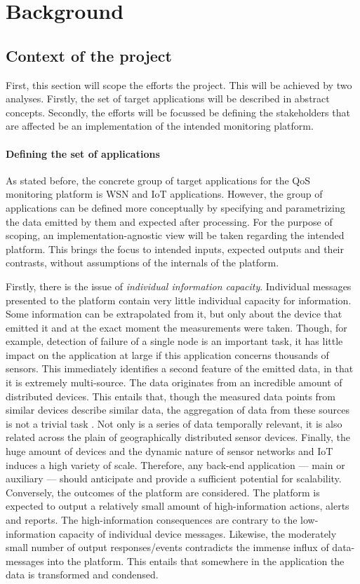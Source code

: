 \chapter{Background}
\label{ch:back}
\section{Context of the project}
\label{sec:back:context}
First, this section will scope the efforts the project. This will be achieved by two analyses. Firstly, the set of target applications will be described in abstract concepts. Secondly, the efforts will be focussed  be defining the stakeholders that are affected be an implementation of the intended monitoring platform.

\subsubsection*{Defining the set of applications}
As stated before, the concrete group of target applications for the QoS monitoring platform is WSN and IoT applications. However, the group of applications can be defined more conceptually by specifying and parametrizing the data emitted by them and expected after processing. For the purpose of scoping, an implementation-agnostic view will be taken regarding the intended platform. This brings the focus to intended inputs, expected outputs and their contrasts, without assumptions of the internals of the platform.

Firstly, there is the issue of \emph{individual information capacity}. Individual messages presented to the platform contain very little individual capacity for information. Some information can be extrapolated from it, but only about the device that emitted it and at the exact moment the measurements were taken. Though, for example, detection of failure of a single node is an important task, it has little impact on the application at large if this application concerns thousands of sensors. This immediately identifies a second feature of the emitted data, in that it is extremely multi-source. The data originates from an incredible amount of distributed devices. This entails that, though the measured data points from similar devices describe similar data, the aggregation of data from these sources is not a trivial task \cite{iot_big_data_difficulties}. Not only is a series of data temporally relevant, it is also related across the plain of geographically distributed sensor devices. Finally, the huge amount of devices and the dynamic nature of sensor networks and IoT induces a high variety of scale. Therefore, any back-end application --- main or auxiliary --- should anticipate and provide a sufficient potential for scalability. Conversely, the outcomes of the platform are considered. The platform is expected to output a relatively small amount of high-information actions, alerts and reports. The high-information consequences are contrary to the low-information capacity of individual device messages. Likewise, the moderately small number of output responses/events contradicts the immense influx of data-messages into the platform. This entails that somewhere in the application the data is transformed and condensed.

